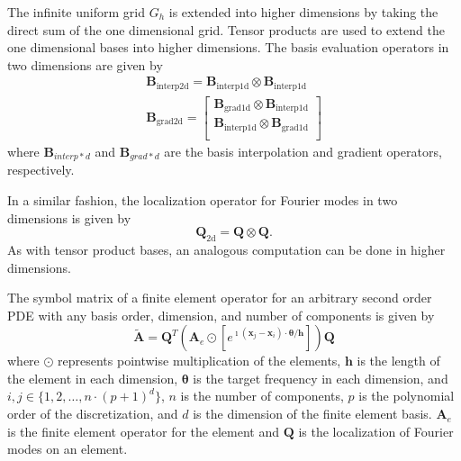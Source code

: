 \documentclass[review]{siamart190516}
\begin{document}
The infinite uniform grid $G_h$ is extended into higher dimensions by taking the direct sum of the one dimensional grid.
Tensor products are used to extend the one dimensional bases into higher dimensions.
The basis evaluation operators in two dimensions are given by
\begin{equation}
\begin{split}
\mathbf{B}_{\text{interp2d}} = \mathbf{B}_{\text{interp1d}} \otimes \mathbf{B}_{\text{interp1d}} \\
\mathbf{B}_{\text{grad2d}} =
\begin{bmatrix}
    \mathbf{B}_{\text{grad1d}} \otimes \mathbf{B}_{\text{interp1d}} \\
    \mathbf{B}_{\text{interp1d}} \otimes \mathbf{B}_{\text{grad1d}} \\
\end{bmatrix}
\end{split}
\end{equation}
where $\mathbf{B}_{interp*d}$ and $\mathbf{B}_{grad*d}$ are the basis interpolation and gradient operators, respectively.

In a similar fashion, the localization operator for Fourier modes in two dimensions is given by
\begin{equation}
\mathbf{Q}_{\text{2d}} = \mathbf{Q} \otimes \mathbf{Q}.
\end{equation}
As with tensor product bases, an analogous computation can be done in higher dimensions.

\begin{definition}
The symbol matrix of a finite element operator for an arbitrary second order PDE with any basis order, dimension, and number of components is given by
\begin{equation}\label{symbolhighorder}
\tilde{\mathbf{A}} = \mathbf{Q}^T \left( \mathbf{A}_e \odot \left[ e^{\imath \left( \mathbf{x}_j - \mathbf{x}_i \right) \cdot \boldsymbol{\theta} / \mathbf{h}} \right] \right) \mathbf{Q}
\end{equation}
where $\odot$ represents pointwise multiplication of the elements, $\mathbf{h}$ is the length of the element in each dimension, $\boldsymbol{\theta}$ is the target frequency in each dimension, and $i, j \in \lbrace 1, 2, \dots, n \cdot \left( p + 1 \right)^d \rbrace$, $n$ is the number of components, $p$ is the polynomial order of the discretization, and $d$ is the dimension of the finite element basis.
$\mathbf{A}_e$ is the finite element operator for the element and $\mathbf{Q}$ is the localization of Fourier modes on an element.
\end{definition}\label{def:high_order_symbol}
\end{document}
